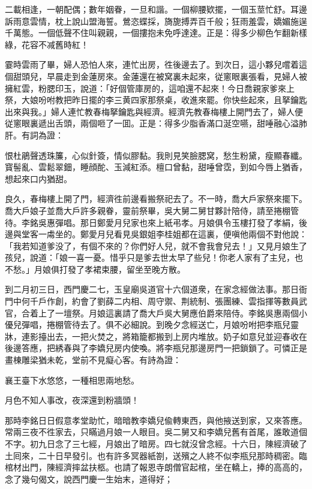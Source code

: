 \begin{myquote}
二載相逢，一朝配偶；數年姻眷，一旦和諧。一個柳腰欵擺，一個玉莖忙舒。耳邊訴雨意雲情，枕上說山盟海誓。鶯恣蝶採，旖旎搏弄百千般；狂雨羞雲，嬌媚施逞千萬態。一個低聲不住叫親親，一個摟抱未免呼達達。正是：得多少柳色乍翻新樣綠，花容不减舊時紅！
\end{myquote}

霎時雲雨了畢，婦人恐怕人來，連忙出房，徃後邊去了。到次日，這小夥兒嚐着這個甜頭兒，早晨走到金蓮房來。金蓮還在被窝裏未起來，従窻眼裏張看，見婦人被擁紅雲，粉腮印玉，說道：「好個管庫房的，這咱還不起來！今日喬親家爹來上祭，大娘吩咐教把昨日擺的李三黄四家那祭桌，收進來罷。你快些起來，且拏鑰匙出來與我。」婦人連忙教春梅拏鑰匙與經濟。經濟先教春梅樓上開門去了，婦人便従窻眼裏遞出舌頭，兩個咂了一囬。正是：得多少脂香滿口涎空嚥，甜唾融心溢肺肝。有詞為證：

\begin{myquote}
恨杜鵑聲透珠簾，心似針簽，情似膠黏。我則見笑臉腮窝，愁生粉黛，瘦顯春纖。寳髻亂、雲鬆翠鈿，睡顔酡、玉減紅添。檀口曾黏，甜唾曾霑，到如今唇上猶香，想起來口内猶甜。
\end{myquote}

良久，春梅樓上開了門，經濟徃前邊看搬祭祀去了。不一時，喬大戶家祭來擺下。喬大戶娘子並喬大戶許多親眷，靈前祭畢，吳大舅二舅甘夥計陪侍，請至捲棚管待。李銘吳惠彈唱。那日鄭愛月兒家也來上紙弔孝。月娘俱令玉樓打發了孝絹，後邊與堂客一䖏坐的。鄭愛月兒看見吳銀姐李桂姐都在這裏，便嗔他兩個不對他說：「我若知道爹没了，有個不來的？你們好人兒，就不會我會兒去！」又見月娘生了孩兒，說道：「娘一喜一憂。惜乎只是爹去世太早了些兒！你老人家有了主兒，也不愁。」月娘俱打發了孝裙束腰，留坐至晚方散。

到二月初三日，西門慶二七，玉皇廟吳道官十六個道衆，在家念經做法事。那日衙門中何千戶作創，約會了劉薛二内相、周守禦、荆統制、張團練、雲指揮等數員武官，合着上了一壇祭。月娘這裏請了喬大戶吳大舅應伯爵來陪侍。李銘吳惠兩個小優兒彈唱，捲棚管待去了。俱不必細說。到晚夕念經送亡，月娘吩咐把李瓶兒靈牀，連影擡出去，一把火焚之，將箱籠都搬到上房内堆放。奶子如意兒並迎春收在後邊答應，把綉春與了李嬌兒房内使喚。將李瓶兒那邊房門一把鎖鎖了。可憐正是畫棟雕梁猶未乾，堂前不見癡心客。有詩為證：

\begin{myquote}
襄王臺下水悠悠，一種相思兩地愁。

月色不知人事改，夜深還到粉牆頭！
\end{myquote}

那時李銘日日假意孝堂助忙，暗暗教李嬌兒偸轉東西，與他掖送到家，又來答應。常兩三夜不徃家去，只瞞過月娘一人眼目。吳二舅又和李嬌兒舊有首尾，誰敢道個不字。初九日念了三七經，月娘出了暗房。四七就沒曾念經。十六日，陳經濟破了土囘來，二十日早發引。也有許多冥器紙劄，送殯之人終不似李瓶兒那時稠密。臨棺材出門，陳經濟摔盆扶柩。也請了報恩寺朗僧官起棺，坐在轎上，捧的高高的，念了幾句偈文，說西門慶一生始末，道得好；


